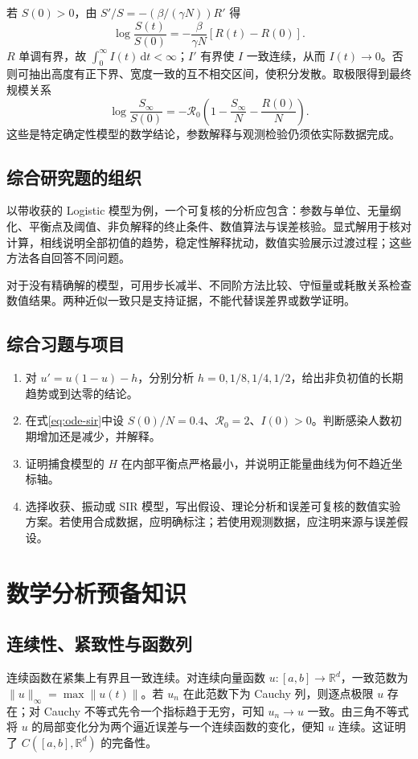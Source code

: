 \documentclass[UTF8,12pt,a4paper,fontset=fandol]{ctexbook}
\begin{document}
若 $S(0)>0$，由 $S'/S=-(\beta/(\gamma N))R'$ 得
\[
 \log\frac{S(t)}{S(0)}=-\frac{\beta}{\gamma N}[R(t)-R(0)].
\]
$R$ 单调有界，故 $\int_0^\infty I(t)\,\mathrm dt<\infty$；$I'$ 有界使 $I$ 一致连续，从而 $I(t)\to0$。否则可抽出高度有正下界、宽度一致的互不相交区间，使积分发散。取极限得到最终规模关系
\[
 \log\frac{S_\infty}{S(0)}
 =-\mathcal R_0\left(1-\frac{S_\infty}{N}-\frac{R(0)}{N}\right).
\]
这些是特定确定性模型的数学结论，参数解释与观测检验仍须依实际数据完成。

\section{综合研究题的组织}
以带收获的 Logistic 模型为例，一个可复核的分析应包含：参数与单位、无量纲化、平衡点及阈值、非负解释的终止条件、数值算法与误差核验。显式解用于核对计算，相线说明全部初值的趋势，稳定性解释扰动，数值实验展示过渡过程；这些方法各自回答不同问题。

对于没有精确解的模型，可用步长减半、不同阶方法比较、守恒量或耗散关系检查数值结果。两种近似一致只是支持证据，不能代替误差界或数学证明。

\section{综合习题与项目}
\begin{enumerate}
 \item\label{ex:ode-harvest} 对 $u'=u(1-u)-h$，分别分析 $h=0,1/8,1/4,1/2$，给出非负初值的长期趋势或到达零的结论。
 \item\label{ex:ode-sir} 在式\eqref{eq:ode-sir}中设 $S(0)/N=0.4$、$\mathcal R_0=2$、$I(0)>0$。判断感染人数初期增加还是减少，并解释。
 \item 证明捕食模型的 $H$ 在内部平衡点严格最小，并说明正能量曲线为何不趋近坐标轴。
 \item 选择收获、振动或 SIR 模型，写出假设、理论分析和误差可复核的数值实验方案。若使用合成数据，应明确标注；若使用观测数据，应注明来源与误差假设。
\end{enumerate}

\appendix

\chapter{数学分析预备知识}
\label{app:ode-analysis}

\section{连续性、紧致性与函数列}
连续函数在紧集上有界且一致连续。对连续向量函数 $u:[a,b]\to\mathbb R^d$，一致范数为 $\|u\|_\infty=\max\|u(t)\|$。若 $u_n$ 在此范数下为 Cauchy 列，则逐点极限 $u$ 存在；对 Cauchy 不等式先令一个指标趋于无穷，可知 $u_n\to u$ 一致。由三角不等式将 $u$ 的局部变化分为两个逼近误差与一个连续函数的变化，便知 $u$ 连续。这证明了 $C([a,b],\mathbb R^d)$ 的完备性。
\end{document}
